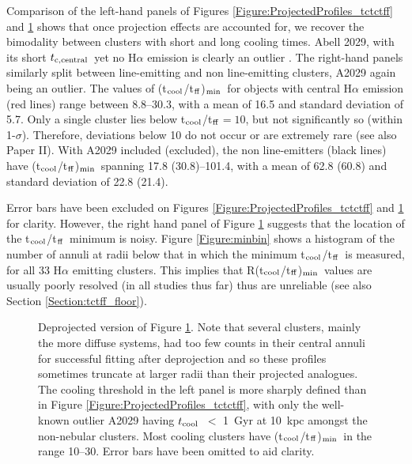 \documentclass[twocolumn]{aastex6}
\newcommand{\tctff}{{t$_{\rm cool}$/t$_{\rm ff}$}}
\newcommand{\tctffmin}{(\tctff)$_{\rm min}$}
\newcommand{\Rtctffmin}{R(\tctff)$_{\rm min}$}
\newcommand{\tc}{$t_{\rm cool}$}
\newcommand{\tccentral}{$t_{\rm c, central}$}
\begin{document}
Comparison of the left-hand panels of Figures \ref{Figure:ProjectedProfiles_tctctff} and \ref{Figure:DeprojectedProfiles_tctctff} shows that once projection effects are accounted for, we recover the bimodality between clusters with short and long cooling times.  Abell 2029, with its short \tccentral\  yet no H$\alpha$ emission \cite[][]{McDonald10} is clearly an outlier \cite[discussed extensively in][]{McNamara16}.  The right-hand panels similarly split between line-emitting and non line-emitting clusters, A2029 again being an outlier. The values of \tctffmin\ for objects with central H$\alpha$ emission (red lines) range between 8.8--30.3, with a mean of 16.5 and standard deviation of 5.7.  Only a single cluster lies below \tctff$=10$, but not significantly so (within 1-$\sigma$).  Therefore, deviations below 10 do not occur or are extremely rare (see also Paper II).  With A2029 included (excluded), the non line-emitters (black lines) have \tctffmin\ spanning 17.8 (30.8)--101.4, with a mean of 62.8 (60.8) and standard deviation of 22.8 (21.4).

Error bars have been excluded on Figures \ref{Figure:ProjectedProfiles_tctctff} and \ref{Figure:DeprojectedProfiles_tctctff} for clarity. However, the right hand panel of Figure \ref{Figure:DeprojectedProfiles_tctctff} suggests that the location of the \tctff\ minimum is noisy. Figure \ref{Figure:minbin} shows a histogram of the number of annuli at radii below that in which the minimum \tctff\ is measured, for all 33 H$\alpha$ emitting clusters.  This implies that \Rtctffmin\ values are usually poorly resolved (in all studies thus far) thus are unreliable (see also Section \ref{Section:tctff_floor}).

\begin{figure*}    
  \centering
  \caption{Deprojected version of Figure \ref{Figure:DeprojectedProfiles_tctctff}. Note that several clusters, mainly the more diffuse systems, had too few counts in their central annuli for successful fitting after deprojection and so these profiles sometimes truncate at larger radii than their projected analogues.  The cooling threshold in the left panel is more sharply defined than in Figure \ref{Figure:ProjectedProfiles_tctctff}, with only the well-known outlier A2029 having \tc\ $<$ 1~Gyr at 10~kpc amongst the non-nebular clusters.  Most cooling clusters have \tctffmin\ in the range 10--30.  Error bars have been omitted to aid clarity.}
 \label{Figure:DeprojectedProfiles_tctctff}
\end{figure*}
\end{document}
